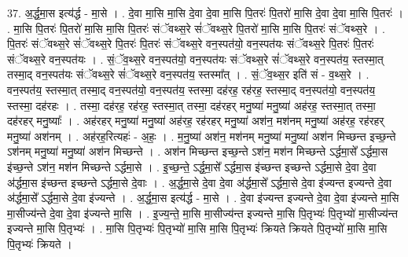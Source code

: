 \documentclass[17pt]{extarticle}
\begin{document}
37. अ॒र्द्ध॒मा॒स इत्य॑र्द्ध - मा॒से । . दे॒वा मा॒सि मा॒सि दे॒वा दे॒वा मा॒सि पि॒तरः॑ पि॒तरो॑ मा॒सि दे॒वा दे॒वा मा॒सि पि॒तरः॑ । . मा॒सि पि॒तरः॑ पि॒तरो॑ मा॒सि मा॒सि पि॒तरः॑ संॅवथ्स॒रे सं॑ॅवथ्स॒रे पि॒तरो॑ मा॒सि मा॒सि पि॒तरः॑ संॅवथ्स॒रे । . पि॒तरः॑ संॅवथ्स॒रे सं॑ॅवथ्स॒रे पि॒तरः॑ पि॒तरः॑ संॅवथ्स॒रे वन॒स्पत॑यो॒ वन॒स्पत॑यः संॅवथ्स॒रे पि॒तरः॑ पि॒तरः॑ संॅवथ्स॒रे वन॒स्पत॑यः । . सं॒ॅव॒थ्स॒रे वन॒स्पत॑यो॒ वन॒स्पत॑यः संॅवथ्स॒रे सं॑ॅवथ्स॒रे वन॒स्पत॑य॒ स्तस्मा॒त् तस्मा॒द् वन॒स्पत॑यः संॅवथ्स॒रे सं॑ॅवथ्स॒रे वन॒स्पत॑य॒ स्तस्मा᳚त् । . सं॒ॅव॒थ्स॒र इति॑ सं - व॒थ्स॒रे । . वन॒स्पत॑य॒ स्तस्मा॒त् तस्मा॒द् वन॒स्पत॑यो॒ वन॒स्पत॑य॒ स्तस्मा॒ दह॑रह॒ रह॑रह॒ स्तस्मा॒द् वन॒स्पत॑यो॒ वन॒स्पत॑य॒ स्तस्मा॒ दह॑रहः । . तस्मा॒ दह॑रह॒ रह॑रह॒ स्तस्मा॒त् तस्मा॒ दह॑रहर् मनु॒ष्या॑ मनु॒ष्या॑ अह॑रह॒ स्तस्मा॒त् तस्मा॒ दह॑रहर् मनु॒ष्याः᳚ । . अह॑रहर् मनु॒ष्या॑ मनु॒ष्या॑ अह॑रह॒ रह॑रहर् मनु॒ष्या॑ अश॑न॒ मश॑नम् मनु॒ष्या॑ अह॑रह॒ रह॑रहर् मनु॒ष्या॑ अश॑नम् । . अह॑रह॒रित्यहः॑ - अ॒हः॒ । . म॒नु॒ष्या॑ अश॑न॒ मश॑नम् मनु॒ष्या॑ मनु॒ष्या॑ अश॑न मिच्छन्त इच्छ॒न्ते ऽश॑नम् मनु॒ष्या॑ मनु॒ष्या॑ अश॑न मिच्छन्ते । . अश॑न मिच्छन्त इच्छ॒न्ते ऽश॑न॒ मश॑न मिच्छन्ते ऽर्द्धमा॒से᳚ ऽर्द्धमा॒स इ॑च्छ॒न्ते ऽश॑न॒ मश॑न मिच्छन्ते ऽर्द्धमा॒से । . इ॒च्छ॒न्ते॒ ऽर्द्ध॒मा॒से᳚ ऽर्द्धमा॒स इ॑च्छन्त इच्छन्ते ऽर्द्धमा॒से दे॒वा दे॒वा अ॑र्द्धमा॒स इ॑च्छन्त इच्छन्ते ऽर्द्धमा॒से दे॒वाः । . अ॒र्द्ध॒मा॒से दे॒वा दे॒वा अ॑र्द्धमा॒से᳚ ऽर्द्धमा॒से दे॒वा इ॑ज्यन्त इज्यन्ते दे॒वा अ॑र्द्धमा॒से᳚ ऽर्द्धमा॒से दे॒वा इ॑ज्यन्ते । . अ॒र्द्ध॒मा॒स इत्य॑र्द्ध - मा॒से । . दे॒वा इ॑ज्यन्त इज्यन्ते दे॒वा दे॒वा इ॑ज्यन्ते मा॒सि मा॒सीज्य॑न्ते दे॒वा दे॒वा इ॑ज्यन्ते मा॒सि । . इ॒ज्य॒न्ते॒ मा॒सि मा॒सीज्य॑न्त इज्यन्ते मा॒सि पि॒तृभ्यः॑ पि॒तृभ्यो॑ मा॒सीज्य॑न्त इज्यन्ते मा॒सि पि॒तृभ्यः॑ । . मा॒सि पि॒तृभ्यः॑ पि॒तृभ्यो॑ मा॒सि मा॒सि पि॒तृभ्यः॑ क्रियते क्रियते पि॒तृभ्यो॑ मा॒सि मा॒सि पि॒तृभ्यः॑ क्रियते । \newline
\end{document}
